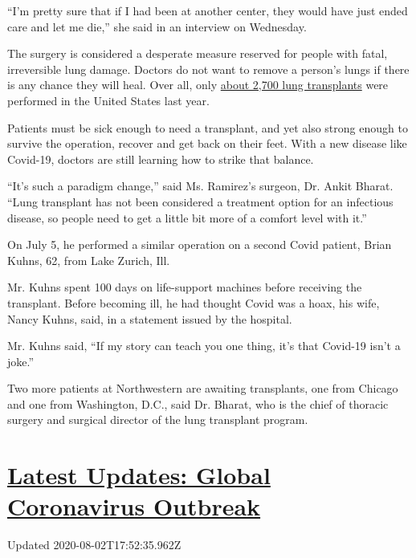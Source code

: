``I'm pretty sure that if I had been at another center, they would have
just ended care and let me die,'' she said in an interview on Wednesday.

The surgery is considered a desperate measure reserved for people with
fatal, irreversible lung damage. Doctors do not want to remove a
person's lungs if there is any chance they will heal. Over all, only
\href{https://unos.org/data/transplant-trends/}{about 2,700 lung
transplants} were performed in the United States last year.

Patients must be sick enough to need a transplant, and yet also strong
enough to survive the operation, recover and get back on their feet.
With a new disease like Covid-19, doctors are still learning how to
strike that balance.

``It's such a paradigm change,'' said Ms. Ramirez's surgeon, Dr. Ankit
Bharat. ``Lung transplant has not been considered a treatment option for
an infectious disease, so people need to get a little bit more of a
comfort level with it.''

On July 5, he performed a similar operation on a second Covid patient,
Brian Kuhns, 62, from Lake Zurich, Ill.

Mr. Kuhns spent 100 days on life-support machines before receiving the
transplant. Before becoming ill, he had thought Covid was a hoax, his
wife, Nancy Kuhns, said, in a statement issued by the hospital.

Mr. Kuhns said, ``If my story can teach you one thing, it's that
Covid-19 isn't a joke.''

Two more patients at Northwestern are awaiting transplants, one from
Chicago and one from Washington, D.C., said Dr. Bharat, who is the chief
of thoracic surgery and surgical director of the lung transplant
program.

\hypertarget{latest-updates-global-coronavirus-outbreak}{%
\section{\texorpdfstring{\href{https://www.nytimes3xbfgragh.onion/2020/08/01/world/coronavirus-covid-19.html?action=click\&pgtype=Article\&state=default\&region=MAIN_CONTENT_1\&context=storylines_live_updates}{Latest
Updates: Global Coronavirus
Outbreak}}{Latest Updates: Global Coronavirus Outbreak}}\label{latest-updates-global-coronavirus-outbreak}}

Updated 2020-08-02T17:52:35.962Z

